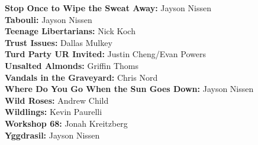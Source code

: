 \begin{flushleft}
\textbf{Stop Once to Wipe the Sweat Away:} Jayson Nissen\\
\textbf{Tabouli:} Jayson Nissen\\
\textbf{Teenage Libertarians:} Nick Koch\\
\textbf{Trust Issues:} Dallas Mulkey\\
\textbf{Turd Party UR Invited:} Justin Cheng/Evan Powers\\
\textbf{Unsalted Almonds:} Griffin Thoms\\
\textbf{Vandals in the Graveyard:} Chris Nord\\
\textbf{Where Do You Go When the Sun Goes Down:} Jayson Nissen\\
\textbf{Wild Roses:} Andrew Child\\
\textbf{Wildlings:} Kevin Paurelli\\
\textbf{Workshop 68:} Jonah Kreitzberg\\
\textbf{Yggdrasil:} Jayson Nissen\\
\end{flushleft}
\onecolumn
\clearpage